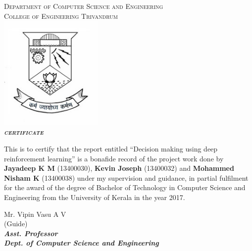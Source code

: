 \documentclass[a4paper,12pt]{report}
\begin{document}
	\begin{titlepage}
		\begin{centering}
			\textsc{\large{Department of Computer Science and Engineering}}\\
			\textsc{\large{College of Engineering Trivandrum}}\\[0.5cm]

			\includegraphics[width=5cm]{images/logo.jpg}\\[0.5cm]
			\textbf{\textit{\LARGE\textsc{{certificate}}}}\\[0.3cm]

		\end{centering}

		\begin{sloppypar}
		\large{This is to certify that the report entitled ``Decision making using deep reinforcement learning'' is a bonafide record of the project work done by \textbf{Jayadeep K M} (13400030), \textbf{Kevin Joseph} (13400032) and \textbf{Mohammed Nisham K} (13400038) under my supervision and guidance, in partial fulfilment for the award of the degree of Bachelor of Technology in Computer Science and Engineering from the University of Kerala in the year 2017.}\\[1.5cm]
		\end{sloppypar}

		\begin{minipage}{0.4\textwidth}
		\begin{flushleft}
		\begin{centering} \large
		\large{Mr. Vipin Vasu A V}\\
		\small{(Guide)}\\
		\small{\textit{\textbf{Asst. Professor}}}\\
		\small{\textit{\textbf{Dept. of Computer Science and Engineering}}}\\[1.5cm]

		\end{centering}
		

\end{flushleft}
\end{minipage}
\end{titlepage}
\end{document}
